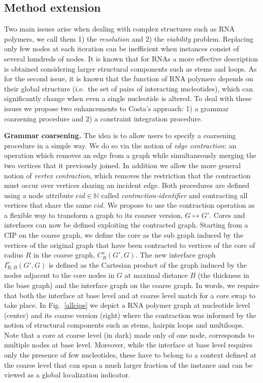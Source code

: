 \documentclass[a4paper]{esannV2}
\newcommand*{\IN}[0]{\ensuremath{\mathbb{N}}}
\begin{document}
\subsection{Method extension}

Two main issues arise when dealing with complex structures such as RNA
polymers, we call them 1) the {\em resolution}\/ and 2) the {\em viability}
problem. Replacing only few nodes at
each iteration can be inefficient when instances consist of several hundreds
of nodes. It is known that for RNAs a more effective description is obtained
considering larger structural components such as stems  and loops. As for the
second issue, it is known that the function of RNA polymers depends on their
global structure (i.e.\ the set of pairs of interacting nucleotides), which can
significantly change when even a single nucleotide is altered. To deal with
these issues we propose two enhancements to Costa's approach: 1) a
grammar coarsening procedure and 2) a constraint integration procedure.


\textbf{Grammar coarsening.} The idea is to allow users to specify 
a coarsening procedure in a simple way. We do so via the notion of {\em edge
contraction}\/:
an operation which removes an edge from a graph while simultaneously merging
the two vertices that it previously joined. In addition we allow the more
general notion of {\em vertex contraction}, which removes the restriction that
the contraction must occur over vertices sharing an incident edge. Both
procedures are defined using a node attribute $cid \in \IN$ called 
{\em contraction-identifier}\/ and contracting all vertices that share the same $cid$. 
We propose to use the contraction operation as a flexible way to
transform a graph to its coarser version, $G \mapsto G'$. Cores and interfaces
can now be defined exploiting the contracted graph. Starting from a CIP on the
coarse graph, we define the core as the sub graph induced by the vertices of
the original graph that have been contracted to vertices of the core of radius
$R$ in the coarse graph, $C_R^v(G',G)$.  The new interface graph
$I_{R,B}^v(G',G)$ is defined as the Cartesian product of the graph induced by
the nodes adjacent to the core nodes in $G$ at maximal distance $B$ (the
thickness in the base graph) and the interface graph on the coarse graph. In
words, we require that both the interface at base level and at coarse level
match for a core swap to take place. In Fig.~\ref{allcips}  we depict a RNA
polymer graph at nucleotide level (center) and its coarse version (right)
where the contraction was informed by the notion of structural components such
as stems, hairpin loops and multiloops. Note that a core at coarse
level (in dark) made only of one node, corresponds to multiple nodes at
base level. Moreover, while the interface at base level requires only the
presence of few nucleotides, these have to belong to a context defined at the
coarse level that can span a much larger fraction of the instance and can be
viewed as a global localization indicator.
\end{document}
